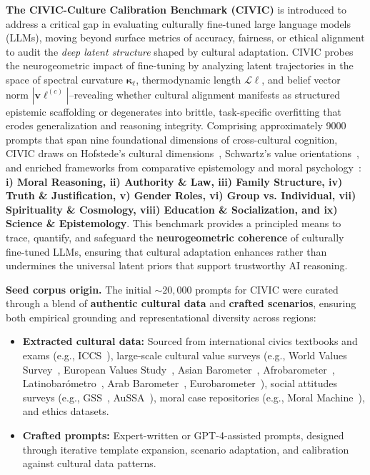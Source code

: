 \noindent
\textbf{The CIVIC-Culture Calibration Benchmark (CIVIC)} is introduced to address a critical gap in evaluating culturally fine-tuned large language models (LLMs), moving beyond surface metrics of accuracy, fairness, or ethical alignment to audit the \emph{deep latent structure} shaped by cultural adaptation. CIVIC probes the neurogeometric impact of fine-tuning by analyzing latent trajectories in the space of spectral curvature $\boldsymbol{\kappa_\ell}$, thermodynamic length $\boldsymbol{\mathcal{L}\ell}$, and belief vector norm $|\mathbf{v}\ell^{(c)}|$--revealing whether cultural alignment manifests as structured epistemic scaffolding or degenerates into brittle, task-specific overfitting that erodes generalization and reasoning integrity. Comprising approximately 9000 prompts that span nine foundational dimensions of cross-cultural cognition, CIVIC draws on Hofstede's cultural dimensions~\citep{hofstede2001culture}, Schwartz’s value orientations~\citep{schwartz1992universals}, and enriched frameworks from comparative epistemology and moral psychology~\citep{minkov2011cultural, nisbett2001culture}: \textbf{i) Moral Reasoning, ii) Authority \& Law, iii) Family Structure, iv) Truth \& Justification, v) Gender Roles, vi) Group vs. Individual, vii) Spirituality \& Cosmology, viii) Education \& Socialization, and ix) Science \& Epistemology}. This benchmark provides a principled means to trace, quantify, and safeguard the \textbf{neurogeometric coherence} of culturally fine-tuned LLMs, ensuring that cultural adaptation enhances rather than undermines the universal latent priors that support trustworthy AI reasoning.

\vspace{0.5em}
\noindent
\textbf{Seed corpus origin.}
The initial $\sim 20{,}000$ prompts for CIVIC were curated through a blend of \textbf{authentic cultural data} and \textbf{crafted scenarios}, ensuring both empirical grounding and representational diversity across regions:
\begin{itemize}[leftmargin=1.5em]
\item \textbf{Extracted cultural data:} Sourced from international civics textbooks and exams (e.g., ICCS~\citep{schulz2010iccs}), large-scale cultural value surveys (e.g., World Values Survey~\citep{inglehart2014wvs}, European Values Study~\citep{halman2001european}, Asian Barometer~\citep{chu2013asianbarometer}, Afrobarometer~\citep{mattes2019afrobarometer}, Latinobarómetro~\citep{latinobarometro2020report}, Arab Barometer~\citep{tessler2008arabbarometer}, Eurobarometer~\citep{eurobarometer2015}), social attitudes surveys (e.g., GSS~\citep{smith2019gss}, AuSSA~\citep{aussa2018}), moral case repositories (e.g., Moral Machine~\citep{awad2018moral}), and ethics datasets.
\item \textbf{Crafted prompts:} Expert-written or GPT-4-assisted prompts, designed through iterative template expansion, scenario adaptation, and calibration against cultural data patterns.
\end{itemize}

